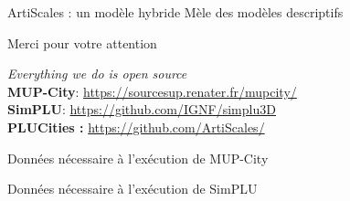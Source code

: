 \documentclass[xcolor=table]{beamer}
\begin{document}
\begin{frame}{ArtiScales : un modèle hybride}
Mèle des modèles descriptifs 
		
\end{frame}



\begin{frame}[standout]
	\centering
	\begin{block}{}	
		\centering	
		Merci pour votre attention
	\end{block}
	\begin{block}{}
		\centering
		\textit{Everything we do is open source}\\
		\large
		\textbf{MUP-City}: \url{https://sourcesup.renater.fr/mupcity/} \\
		\textbf{SimPLU}: \url{https://github.com/IGNF/simplu3D}\\
		\textbf{PLUCities :} \url{https://github.com/ArtiScales/}  
	\end{block}
\end{frame}

\begin{frame}{Données nécessaire à l'exécution de MUP-City}
\end{frame}
\begin{frame}{Données nécessaire à l'exécution de SimPLU}
\end{frame}
\end{document}
